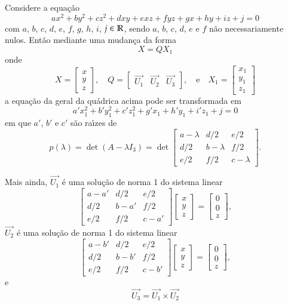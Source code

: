 \begin{teorema}
  Considere a equa\c{c}\~ao
  \[
      ax^2 + by^2 + cz^2 + dxy + exz + fyz + gx + hy + iz + j = 0
  \]
  com $a$, $b$, $c$, $d$, $e$, $f$, $g$, $h$, $i$, $j \in \mathbb{R}$, sendo $a$, $b$, $c$, $d$, $e$ e $f$ n\~ao necessariamente nulos. Ent\~ao mediante uma mudan\c{c}a da forma
  \[
    X = Q X_1
  \]
  onde
  \[
    X = \begin{bmatrix}
      x\\y\\z
    \end{bmatrix}, \quad
    Q = \begin{bmatrix}
    	\vec{U_1} & \vec{U_2} & \vec{U_3}
  \end{bmatrix}, \quad\mbox{e}\quad
  X_1 = \begin{bmatrix}
    x_1\\y_1\\z_1
  \end{bmatrix}
  \]
  a equa\c{c}\~ao da geral da qu\'adrica acima pode ser transformada em
  \[
    a'x_1^2 + b'y_1^2 + c'z_1^2 + g'x_1 + h'y_1 + i'z_1 + j = 0
  \]
  em que $a'$, $b'$ e $c'$ s\~ao ra{\'\i}zes de
  \[
    p(\lambda) = \det(A - \lambda I_3) = \det \begin{bmatrix}
      a - \lambda & d/2 & e/2\\
      d/2 & b - \lambda & f/2\\
      e/2 & f/2 & c - \lambda
    \end{bmatrix}.
  \]

  Mais ainda, $\vec{U_1}$ \'e uma solu\c{c}\~ao de norma 1 do sistema linear
  \[
    \begin{bmatrix}
      a - a' & d/2 & e/2\\
      d/2 & b - a' & f/2\\
      e/2 & f/2 & c - a'
    \end{bmatrix} \begin{bmatrix}
      x\\y\\z
    \end{bmatrix} = \begin{bmatrix}
      0\\0\\z
    \end{bmatrix},
  \]
  $\vec{U_2}$ \'e uma solu\c{c}\~ao de norma 1 do sistema linear
  \[
    \begin{bmatrix}
      a - b' & d/2 & e/2\\
      d/2 & b - b' & f/2\\
      e/2 & f/2 & c - b'
    \end{bmatrix} \begin{bmatrix}
      x\\y\\z
    \end{bmatrix} = \begin{bmatrix}
      0\\0\\z
    \end{bmatrix},
  \]
  e
  \[
  	\vec{U_3} = \vec{U_1} \times \vec{U_2}
  \]
\end{teorema}

